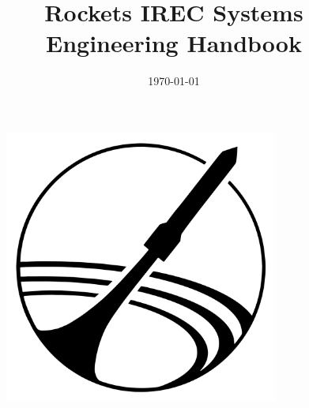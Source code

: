 \documentclass[11pt,letterpaper,oneside]{memoir}
\title{Rockets IREC Systems Engineering Handbook}
\author{}
\date{\today}
\begin{document}
\begin{figure}[t]
\centering
  \includegraphics[height= 9cm]{Figures/logo.png}
\end{figure}

\titlep



\renewcommand{\chaptitlefont}{\normalfont\Large\bfseries}
\newpage
\tableofcontents*  %
\renewcommand{\chaptitlefont}{\normalfont\Huge\bfseries}


   










\begin{appendices}
 \end{appendices}
 
\end{document}
